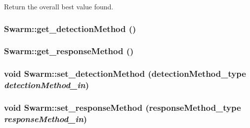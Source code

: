 Return the overall best value found. 

\hypertarget{classSwarm_1f6eec525de52241c5b1272a07361e20}{
\subsubsection{ Swarm::get\_\-detectionMethod ()}}
\label{classSwarm_1f6eec525de52241c5b1272a07361e20}


\hypertarget{classSwarm_eee2a8aaef1290bf85df295881aab486}{
\subsubsection{ Swarm::get\_\-responseMethod ()}}
\label{classSwarm_eee2a8aaef1290bf85df295881aab486}


\hypertarget{classSwarm_b90bce798796c7b9cee3322e7531df34}{
\subsubsection{\setlength{\rightskip}{0pt plus 5cm}void Swarm::set\_\-detectionMethod ({\bf detectionMethod\_\-type} {\em detectionMethod\_\-in})}}
\label{classSwarm_b90bce798796c7b9cee3322e7531df34}


\hypertarget{classSwarm_896cd984569235391fc53353d87a9337}{
\subsubsection{\setlength{\rightskip}{0pt plus 5cm}void Swarm::set\_\-responseMethod ({\bf responseMethod\_\-type} {\em responseMethod\_\-in})}}
\label{classSwarm_896cd984569235391fc53353d87a9337}


